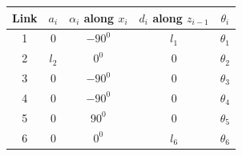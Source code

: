 \documentclass[fleqn,english,11pt,a4paper,landscape]{article}
\begin{document}
	\begin{tabular}{|c|c|c|c|c|}
		\hline
		Link & $a_i$ & $\alpha_i$ along $x_i$ & $d_i$ along $z_{i-1}$ & $\theta_i$  \\
		\hline
		1 & 0  & $-90^0$ & $l_1$ &  $\theta_1$ \\
		\hline
		
		2 & $l_2$ & $0^0$ & $0$ &  $\theta_2$  \\
		\hline
		
		3 & 0 & $-90^0$ &$0$&  $\theta_3$  \\
		\hline
		
		4 & $0$ & $-90^0$ & $0$ &  $\theta_4$  \\
		\hline
		
		5 & $0$ & $90^0$ & $0$&  $\theta_5$  \\
		\hline
		
		6 & $0$ & $0^0$ & $l_6$&  $\theta_6$  \\
		\hline
		

	\end{tabular}
	
\end{document}
